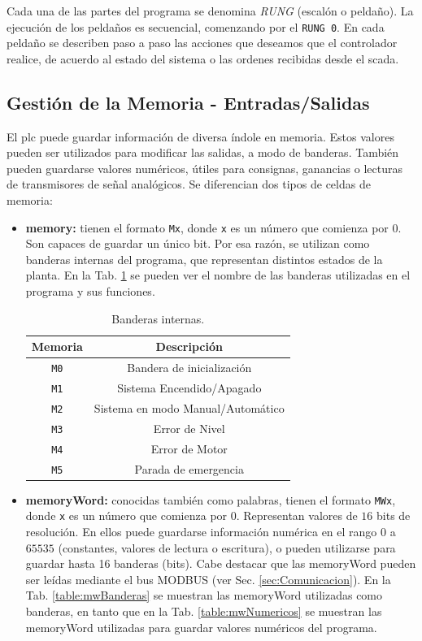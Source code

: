 Cada una de las partes del programa se denomina \emph{RUNG} (escalón o
peldaño).
La ejecución de los peldaños es secuencial, comenzando por el  \verb|RUNG 0|.
En cada peldaño se describen paso a paso las acciones que deseamos que
el controlador realice, de acuerdo al estado del sistema o las ordenes
recibidas desde el \gls{scada}.

\subsection{Gestión de la Memoria - Entradas/Salidas}

El \gls{plc} puede guardar información de diversa índole en memoria.
Estos valores pueden ser utilizados para modificar las salidas, a
modo de banderas.
También pueden guardarse valores numéricos, útiles para consignas,
ganancias o lecturas de transmisores de señal analógicos.
Se diferencian dos tipos de celdas de memoria:

\begin{itemize}
 \item \textbf{\gls{memory}:} tienen el formato \verb|Mx|, donde \verb|x| es un
número que comienza por $0$.
Son capaces de guardar un único bit.
Por esa razón, se utilizan como banderas internas del programa, que representan
distintos estados de la planta.
En la Tab. \ref{table:Banderasinternas} se pueden ver el nombre
de las banderas utilizadas en el programa y sus funciones.
\begin{table}[ht]
\renewcommand{\arraystretch}{1.3}
\centering
\begin{tabular}{c||c}
\hline
\bfseries Memoria & \bfseries Descripción\\
\hline \hline
\verb|M0|  & Bandera de inicialización\\
\verb|M1|  & Sistema Encendido/Apagado\\
\verb|M2|  & Sistema en modo Manual/Automático\\
\verb|M3|  & Error de Nivel\\
\verb|M4|  & Error de Motor\\
\verb|M5|  & Parada de emergencia\\
\hline
\end{tabular}
\caption{Banderas internas.}
\label{table:Banderasinternas}
\end{table}

 \item \textbf{\gls{memoryWord}:} conocidas también como palabras, tienen el
formato \verb|MWx|, donde \verb|x| es un número que comienza por $0$.
Representan valores de $16$ bits de resolución. En ellos puede guardarse
información numérica en el rango $0$ a $65535$
(constantes, valores de lectura o escritura), o pueden utilizarse para guardar
hasta 16 banderas (bits).
Cabe destacar que las \gls{memoryWord} pueden ser leídas mediante el bus MODBUS
(ver Sec. \ref{sec:Comunicacion}).
En la Tab. \ref{table:mwBanderas} se muestran las \gls{memoryWord}
utilizadas como banderas, en tanto que en la Tab.
\ref{table:mwNumericos}
se muestran las \gls{memoryWord} utilizadas para guardar valores numéricos del
programa.
\end{itemize}


